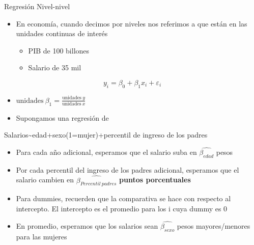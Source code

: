 \documentclass[
  ignorenonframetext,
]{beamer}
\providecommand{\tightlist}{%
  \setlength{\itemsep}{0pt}\setlength{\parskip}{0pt}}
\begin{document}
\begin{frame}{Regresión Nivel-nivel}
\protect\hypertarget{regresiuxf3n-nivel-nivel}{}
\begin{itemize}
\tightlist
\item
  En economía, cuando decimos por niveles nos referimos a que están en
  las unidades continuas de interés

  \begin{itemize}
  \tightlist
  \item
    PIB de 100 billones
  \item
    Salario de 35 mil
  \end{itemize}
\end{itemize}

\[y_i=\beta_0+\beta_1x_i+\varepsilon_i\]

\begin{itemize}
\tightlist
\item
  \(\text{unidades} \ \beta_1= \frac{\text{unidades} \ y}{\text{unidades} \ x}\)
\end{itemize}
\end{frame}

\begin{frame}{}
\protect\hypertarget{section-46}{}
\begin{itemize}
\tightlist
\item
  Supongamos una regresión de
\end{itemize}

Salarios\textasciitilde edad+sexo(1=mujer)+percentil de ingreso de los
padres

\begin{itemize}
\item
  Para cada año adicional, esperamos que el salario suba en
  \(\hat{\beta_{edad}}\) pesos
\item
  Por cada percentil del ingreso de los padres adicional, esperamos que
  el salario cambien en \(\hat{\beta_{Percentil \ padres}}\)
  \textbf{puntos porcentuales}
\end{itemize}
\end{frame}

\begin{frame}{}
\protect\hypertarget{section-47}{}
\begin{itemize}
\item
  Para dummies, recuerden que la comparativa se hace con respecto al
  intercepto. El intercepto es el promedio para los i cuya dummy es 0
\item
  En promedio, esperamos que los salarios sean \(\hat{\beta_{sexo}}\)
  pesos mayores/menores para las mujeres
\end{itemize}
\end{frame}
\end{document}

